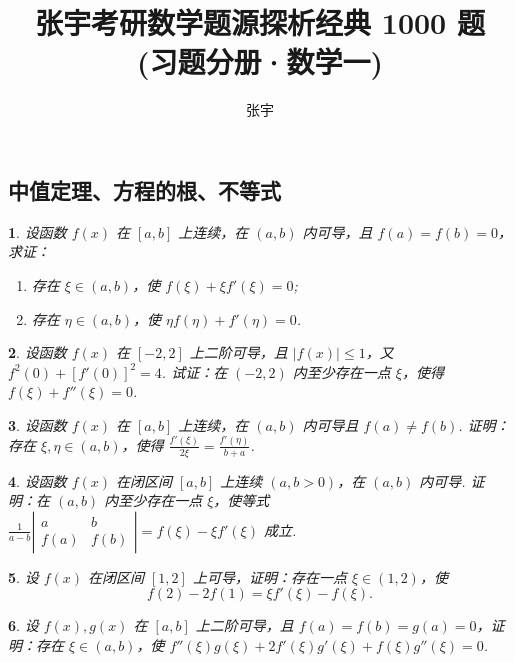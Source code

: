 \documentclass[openany,twocolumn]{ctexbook}
\title{张宇考研数学题源探析经典 1000 题\\(习题分册·数学一)}
\author{张宇}
\theoremstyle{change}
\newtheorem{ti}{}[section]
\def\leq{\leqslant}
\begin{document}
	
	\subsection{中值定理、方程的根、不等式}

	\begin{ti}
		设函数 $f(x)$ 在 $[a,b]$ 上连续，在 $(a,b)$ 内可导，且 $f(a) = f(b) = 0$，求证：
		\begin{enumerate}
			\item 存在 $\xi \in (a,b)$，使 $f(\xi) + \xi f'(\xi) = 0$;
			\item 存在 $\eta \in (a,b)$，使 $\eta f(\eta) + f'(\eta) = 0$.
		\end{enumerate}
	\end{ti}

	\begin{ti}
		设函数 $f(x)$ 在 $[-2,2]$ 上二阶可导，且 $\left| f(x) \right| \leq 1$，又 $f^{2}(0) + \left[ f'(0) \right]^{2} = 4$. 试证：在 $(-2,2)$ 内至少存在一点 $\xi$，使得 $f(\xi) + f''(\xi) = 0$.
	\end{ti}

	\begin{ti}
		设函数 $f(x)$ 在 $[a,b]$ 上连续，在 $(a,b)$ 内可导且 $f(a) \ne f(b)$. 证明：存在 $\xi,\eta \in (a,b)$，使得 $\frac{f'(\xi)}{2\xi} = \frac{f'(\eta)}{b + a}$.
	\end{ti}

	\begin{ti}
		设函数 $f(x)$ 在闭区间 $[a,b]$ 上连续 $(a,b > 0)$，在 $(a,b)$ 内可导. 证明：在 $(a,b)$ 内至少存在一点 $\xi$，使等式 $\frac{1}{a - b} \left| \begin{smallmatrix}
			a & b\\
			f(a) & f(b)
		\end{smallmatrix} \right| = f(\xi) - \xi f'(\xi)$ 成立.
	\end{ti}

	\begin{ti}
		设 $f(x)$ 在闭区间 $[1,2]$ 上可导，证明：存在一点 $\xi \in (1,2)$，使
		\[
			f(2) - 2f(1) = \xi f'(\xi) - f(\xi).
		\]
	\end{ti}

	\begin{ti}
		设 $f(x), g(x)$ 在 $[a,b]$ 上二阶可导，且 $f(a) = f(b) = g(a) = 0$，证明：存在 $\xi \in (a,b)$，使 $f''(\xi) g(\xi) + 2 f'(\xi) g'(\xi) + f(\xi) g''(\xi) = 0$.
	\end{ti}
\end{document}
